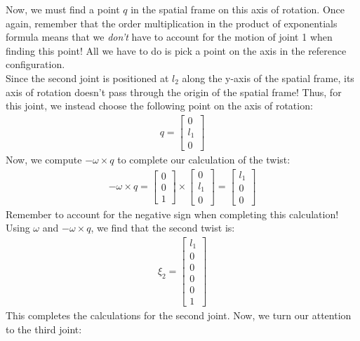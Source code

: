 \documentclass[oneside]{book}
\begin{document}
Now, we must find a point $q$ in the spatial frame on this axis of rotation. Once again, remember that the order multiplication in the product of exponentials formula means that we \textit{don't} have to account for the motion of joint 1 when finding this point! All we have to do is pick a point on the axis in the reference configuration.\\
Since the second joint is positioned at $l_2$ along the y-axis of the spatial frame, its axis of rotation doesn't pass through the origin of the spatial frame! Thus, for this joint, we instead choose the following point on the axis of rotation:
\begin{align}
    q = 
    \begin{bmatrix}
        0\\
        l_1\\
        0
    \end{bmatrix}
\end{align}
Now, we compute $-\omega \times q$ to complete our calculation of the twist:
\begin{align}
    -\omega \times q = 
    \begin{bmatrix}
       0\\
       0\\
       1
    \end{bmatrix}
    \times 
    \begin{bmatrix}
        0\\
        l_1\\
        0
    \end{bmatrix}
    = 
    \begin{bmatrix}
       l_1\\
       0\\
       0
    \end{bmatrix}
\end{align}
Remember to account for the negative sign when completing this calculation!\\
Using $\omega$ and $-\omega\times q$, we find that the second twist is:
\begin{align}
    \xi_2 = 
    \begin{bmatrix}
    l_1\\
    0\\
    0\\
    0\\
    0\\
    1
    \end{bmatrix}
\end{align}
This completes the calculations for the second joint. Now, we turn our attention to the third joint:
\end{document}
